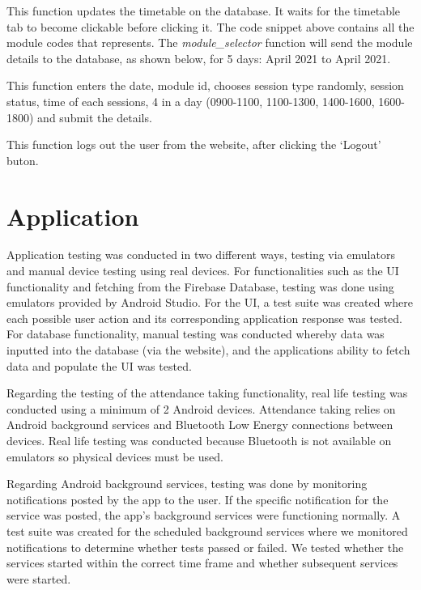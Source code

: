 \documentclass[../report.tex]{subfiles}
\begin{document}
This function updates the timetable on the database. It waits for the timetable tab to become clickable before clicking it. The code snippet above contains all the module codes that represents. The \textit{module\_selector} function will send the module details to the database, as shown below, for 5 days: April  2021 to April  2021.



This function enters the date, module id, chooses session type randomly, session status, time of each sessions, 4 in a day (0900-1100, 1100-1300, 1400-1600, 1600-1800) and submit the details.



This function logs out the user from the website, after clicking the ‘Logout’ buton.

\section{Application}
Application testing was conducted in two different ways, testing via emulators and manual device testing using real devices. For functionalities such as the UI functionality and fetching from the Firebase Database, testing was done using emulators provided by Android Studio. For the UI, a test suite was created where each possible user action and its corresponding application response was tested. For database functionality, manual testing was conducted whereby data was inputted into the database (via the website), and the applications ability to fetch data and populate the UI was tested.

Regarding the testing of the attendance taking functionality, real life testing was conducted using a minimum of 2 Android devices. Attendance taking relies on Android background services and Bluetooth Low Energy connections between devices. Real life testing was conducted because Bluetooth is not available on emulators so physical devices must be used. 

Regarding Android background services, testing was done by monitoring notifications posted by the app to the user. If the specific notification for the service was posted, the app’s background services were functioning normally. A test suite was created for the scheduled background services where we monitored notifications to determine whether tests passed or failed. We tested whether the services started within the correct time frame and whether subsequent services were started.
\end{document}
